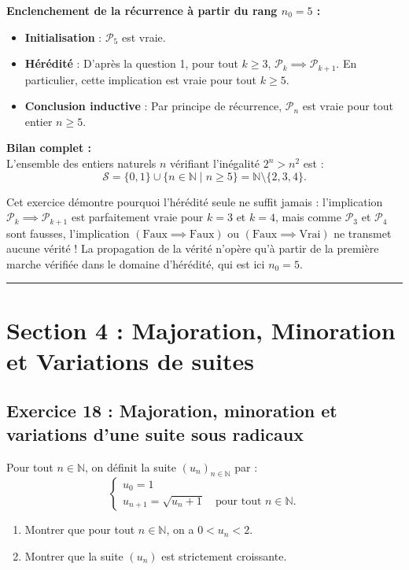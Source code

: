 \documentclass[11pt,a4paper]{article}
\newcommand{\N}{\mathbb{N}}
\begin{document}
\begin{correctionbox}
\textbf{Enclenchement de la récurrence à partir du rang $n_0 = 5$ :}
\begin{itemize}
    \item \textbf{Initialisation} : $\mathcal{P}_5$ est vraie.
    \item \textbf{Hérédité} : D'après la question 1, pour tout $k \ge 3$, $\mathcal{P}_k \implies \mathcal{P}_{k+1}$. En particulier, cette implication est vraie pour tout $k \ge 5$.
    \item \textbf{Conclusion inductive} : Par principe de récurrence, $\mathcal{P}_n$ est vraie pour tout entier $n \ge 5$.
\end{itemize}

\textbf{Bilan complet :}\\
L'ensemble des entiers naturels $n$ vérifiant l'inégalité $2^n > n^2$ est :
\[
\mathcal{S} = \{0, 1\} \cup \{n \in \N \mid n \ge 5\} = \N \setminus \{2, 3, 4\}.
\]
\end{correctionbox}

\begin{remarquabox}
Cet exercice démontre pourquoi l'hérédité seule ne suffit jamais : l'implication $\mathcal{P}_k \implies \mathcal{P}_{k+1}$ est parfaitement vraie pour $k = 3$ et $k = 4$, mais comme $\mathcal{P}_3$ et $\mathcal{P}_4$ sont fausses, l'implication $(\text{Faux} \implies \text{Faux})$ ou $(\text{Faux} \implies \text{Vrai})$ ne transmet aucune vérité ! La propagation de la vérité n'opère qu'à partir de la première marche vérifiée dans le domaine d'hérédité, qui est ici $n_0 = 5$.
\end{remarquabox}

\vspace{1cm}
\hrule
\vspace{1cm}
\section{Section 4 : Majoration, Minoration et Variations de suites}

\subsection*{Exercice 18 : Majoration, minoration et variations d'une suite sous radicaux}

Pour tout $n \in \N$, on définit la suite $(u_n)_{n \in \N}$ par :
\[
\begin{cases}
u_0 = 1 \\
u_{n+1} = \sqrt{u_n + 1} \quad \text{pour tout } n \in \N.
\end{cases}
\]
\begin{enumerate}
    \item Montrer que pour tout $n \in \N$, on a $0 < u_n < 2$.
    \item Montrer que la suite $(u_n)$ est strictement croissante.
\end{enumerate}
\end{document}
